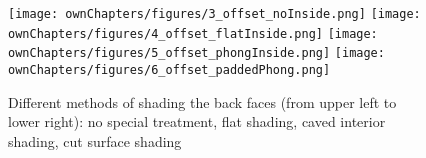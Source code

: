\begin{figure}%
\centering
\texttt{[image: ownChapters/figures/3\_offset\_noInside.png]}%
\hspace{7.00mm}
\texttt{[image: ownChapters/figures/4\_offset\_flatInside.png]}%
\hspace{7.00mm}
\texttt{[image: ownChapters/figures/5\_offset\_phongInside.png]}%
\hspace{7.00mm}
\texttt{[image: ownChapters/figures/6\_offset\_paddedPhong.png]}%
\caption{Different methods of shading the back faces (from upper left to lower right): no special treatment, flat shading, caved interior shading, cut surface shading}%
\label{fig:shading}%
\end{figure}
